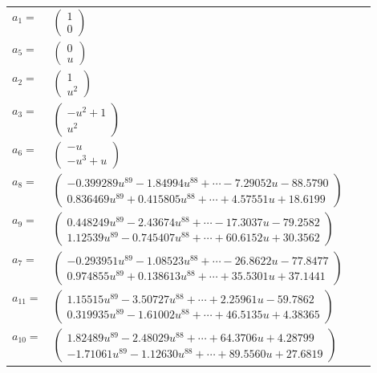 \documentclass[1p]{elsarticle_modified}
\theoremstyle{definition}
\begin{document}
\begin{tabular}{m{7pt} m{180pt} m{7pt} m{180pt} }
\flushright $a_{1}=$&$\begin{pmatrix}1\\0\end{pmatrix}$ \\
\flushright $a_{5}=$&$\begin{pmatrix}0\\u\end{pmatrix}$ \\
\flushright $a_{2}=$&$\begin{pmatrix}1\\u^2\end{pmatrix}$ \\
\flushright $a_{3}=$&$\begin{pmatrix}- u^2+1\\u^2\end{pmatrix}$ \\
\flushright $a_{6}=$&$\begin{pmatrix}- u\\- u^3+u\end{pmatrix}$ \\
\flushright $a_{8}=$&$\begin{pmatrix}-0.399289 u^{89}-1.84994 u^{88}+\cdots-7.29052 u-88.5790\\0.836469 u^{89}+0.415805 u^{88}+\cdots+4.57551 u+18.6199\end{pmatrix}$ \\
\flushright $a_{9}=$&$\begin{pmatrix}0.448249 u^{89}-2.43674 u^{88}+\cdots-17.3037 u-79.2582\\1.12539 u^{89}-0.745407 u^{88}+\cdots+60.6152 u+30.3562\end{pmatrix}$ \\
\flushright $a_{7}=$&$\begin{pmatrix}-0.293951 u^{89}-1.08523 u^{88}+\cdots-26.8622 u-77.8477\\0.974855 u^{89}+0.138613 u^{88}+\cdots+35.5301 u+37.1441\end{pmatrix}$ \\
\flushright $a_{11}=$&$\begin{pmatrix}1.15515 u^{89}-3.50727 u^{88}+\cdots+2.25961 u-59.7862\\0.319935 u^{89}-1.61002 u^{88}+\cdots+46.5135 u+4.38365\end{pmatrix}$ \\
\flushright $a_{10}=$&$\begin{pmatrix}1.82489 u^{89}-2.48029 u^{88}+\cdots+64.3706 u+4.28799\\-1.71061 u^{89}-1.12630 u^{88}+\cdots+89.5560 u+27.6819\end{pmatrix}$ \\

\end{tabular}
\end{document}

